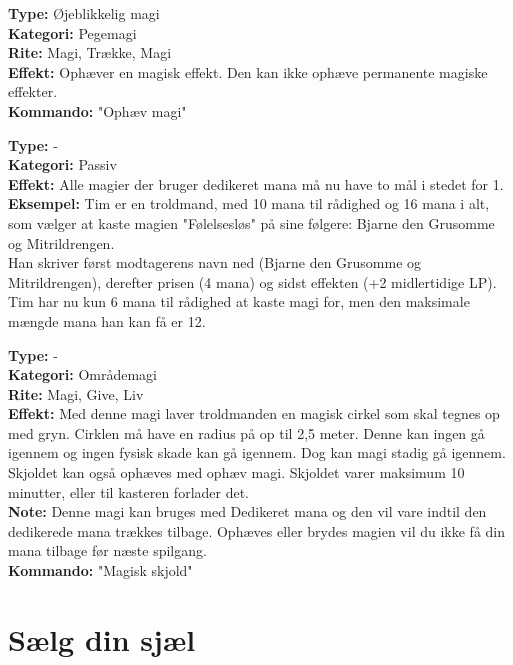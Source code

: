 \begin{primærMagi*}
\textbf{Type:} Øjeblikkelig magi\\
\textbf{Kategori:} Pegemagi\\
\textbf{Rite:} Magi, Trække, Magi\\
\textbf{Effekt:} Ophæver en magisk effekt. Den kan ikke ophæve permanente magiske effekter.\\ 
\textbf{Kommando:} "Ophæv magi"
\end{primærMagi*}

\begin{primærMagi*}
\textbf{Type:} - \\
\textbf{Kategori:} Passiv \\
\textbf{Effekt:} Alle magier der bruger dedikeret mana må nu have to mål i stedet for 1.\\
\textbf{Eksempel:} Tim er en troldmand, med 10 mana til rådighed og 16 mana i alt, som vælger at kaste magien "Følelsesløs" på sine følgere: Bjarne den Grusomme og Mitrildrengen.\\ 
Han skriver først modtagerens navn ned (Bjarne den Grusomme og Mitrildrengen), derefter prisen (4 mana) og sidst effekten (+2 midlertidige LP).\\
Tim har nu kun 6 mana til rådighed at kaste magi for, men den maksimale mængde mana han kan få er 12.
\end{primærMagi*}

\begin{primærMagi*}
\textbf{Type:} -\\
\textbf{Kategori:} Områdemagi \\
\textbf{Rite:} Magi, Give, Liv \\
\textbf{Effekt:} Med denne magi laver troldmanden en magisk cirkel som skal tegnes op med gryn. Cirklen må have
en radius på op til 2,5 meter. Denne kan ingen gå igennem og ingen fysisk skade kan gå igennem. Dog kan magi stadig gå igennem. Skjoldet kan også ophæves med ophæv magi. Skjoldet varer maksimum 10 minutter, eller til kasteren forlader det. \\
\textbf{Note:} Denne magi kan bruges med Dedikeret mana og den vil vare indtil den dedikerede mana trækkes tilbage. Ophæves eller brydes magien vil du ikke få din mana tilbage før næste spilgang.\\
\textbf{Kommando:} "Magisk skjold"
\end{primærMagi*}

\section{Sælg din sjæl}

